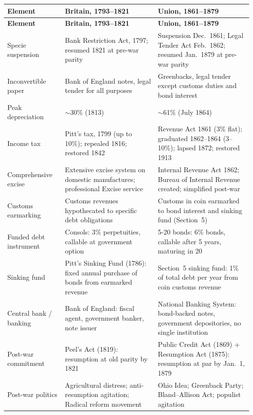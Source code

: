 \documentclass[12pt]{article}
\begin{document}
\begin{center}
\small
\begin{longtable}{p{3.8cm}p{4.5cm}p{4.5cm}}
\toprule
\textbf{Element} & \textbf{Britain, 1793--1821} & \textbf{Union, 1861--1879} \\
\midrule
\endfirsthead
\toprule
\textbf{Element} & \textbf{Britain, 1793--1821} & \textbf{Union, 1861--1879} \\
\midrule
\endhead
\bottomrule
\endlastfoot
Specie suspension &
  Bank Restriction Act, 1797; resumed 1821 at pre-war parity &
  Suspension Dec.~1861; Legal Tender Act Feb.~1862; resumed Jan.~1879 at pre-war parity \\[0.5em]
Inconvertible paper &
  Bank of England notes, legal tender for all purposes &
  Greenbacks, legal tender except customs duties and bond interest \\[0.5em]
Peak depreciation &
  $\sim$30\% (1813) &
  $\sim$61\% (July 1864) \\[0.5em]
Income tax &
  Pitt's tax, 1799 (up to 10\%); repealed 1816; restored 1842 &
  Revenue Act 1861 (3\% flat); graduated 1862--1864 (3--10\%); lapsed 1872; restored 1913 \\[0.5em]
Comprehensive excise &
  Extensive excise system on domestic manufactures; professional Excise service &
  Internal Revenue Act 1862; Bureau of Internal Revenue created; simplified post-war \\[0.5em]
Customs earmarking &
  Customs revenues hypothecated to specific debt obligations &
  Customs in coin earmarked to bond interest and sinking fund (Section~5) \\[0.5em]
Funded debt instrument &
  Consols: 3\% perpetuities, callable at government option &
  5-20 bonds: 6\% bonds, callable after 5 years, maturing in 20 \\[0.5em]
Sinking fund &
  Pitt's Sinking Fund (1786): fixed annual purchase of bonds from earmarked revenue &
  Section~5 sinking fund: 1\% of total debt per year from coin customs revenue \\[0.5em]
Central bank / banking &
  Bank of England: fiscal agent, government banker, note issuer &
  National Banking System: bond-backed notes, government depositories, no single institution \\[0.5em]
Post-war commitment &
  Peel's Act (1819): resumption at old parity by 1821 &
  Public Credit Act (1869) + Resumption Act (1875): resumption at par by Jan.~1, 1879 \\[0.5em]
Post-war politics &
  Agricultural distress; anti-resumption agitation; Radical reform movement &
  Ohio Idea; Greenback Party; Bland--Allison Act; populist agitation \\[0.5em]
\end{longtable}
\end{center}
\end{document}
